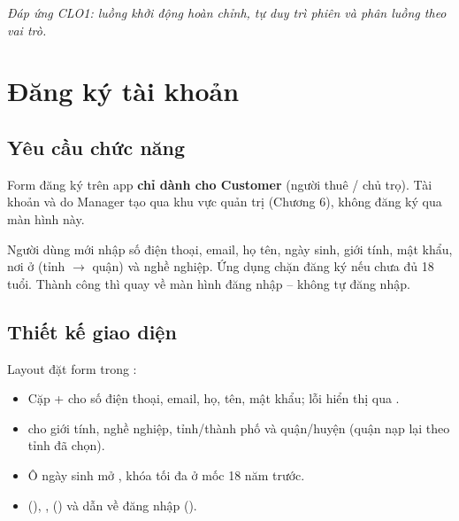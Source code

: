 \textit{Đáp ứng CLO1: luồng khởi động hoàn chỉnh, tự duy trì phiên và phân
luồng theo vai trò.}

\section{Đăng ký tài khoản}

\subsection{Yêu cầu chức năng}
Form đăng ký trên app \textbf{chỉ dành cho Customer} (người thuê / chủ
trọ). Tài khoản  và  do Manager tạo qua khu
vực quản trị (Chương 6), không đăng ký qua màn hình này.

Người dùng mới nhập số điện thoại, email, họ tên, ngày sinh, giới tính,
mật khẩu, nơi ở (tỉnh $\rightarrow$ quận) và nghề nghiệp. Ứng dụng chặn
đăng ký nếu chưa đủ 18 tuổi. Thành công thì quay về màn hình đăng nhập --
không tự đăng nhập.

\subsection{Thiết kế giao diện}
Layout  đặt form trong :
\begin{itemize}
    \item Cặp  +  cho số
    điện thoại, email, họ, tên, mật khẩu; lỗi hiển thị qua
    .
    \item {} cho giới tính, nghề nghiệp, tỉnh/thành
    phố và quận/huyện (quận nạp lại theo tỉnh đã chọn).
    \item Ô ngày sinh mở , khóa tối đa ở mốc 18 năm
    trước.
    \item {} (), ,
     () và  dẫn về
    đăng nhập ().
\end{itemize}

